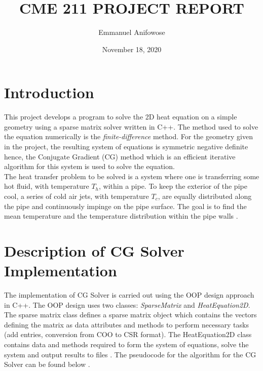 \documentclass{article}
\title{CME 211 PROJECT REPORT}
\author{Emmanuel Anifowose}
\date{November 18, 2020}
\begin{document}
\setlength{\parindent}{0pt}
\setlength{\parskip}{1ex}

\maketitle

\section{Introduction}
This project develops a program to solve the 2D heat equation on a simple geometry
using a sparse matrix solver written in C++. The method used to solve the equation
numerically is the \emph{finite-difference} method. For the geometry given in the project,
the resulting system of equations is symmetric negative definite hence, the Conjugate
Gradient (CG) method which is an efficient iterative algorithm for this system is
used to solve the equation\cite{CME211:2020:ProjectPart1}.\\
The heat transfer problem to be solved is a system where one is transferring some hot
fluid, with temperature $T_h$, within a pipe. To keep the exterior of the pipe cool,
a series of cold air jets, with temperature $T_c$, are equally distributed along the
pipe and continuously impinge on the pipe surface. The goal is to find the mean
temperature and the temperature distribution within the pipe walls
\cite{CME211:2020:ProjectPart2}.

\section{Description of CG Solver Implementation}
The implementation of CG Solver is carried out using the OOP design approach in C++.
The OOP design uses two classes: \emph{SparseMatrix} and \emph{HeatEquation2D}.\\ The
sparse matrix class defines a sparse matrix object which contains the vectors defining
the matrix as data attributes and methods to perform necessary tasks (add entries,
conversion from COO to CSR format). The HeatEquation2D class contains data and methods
required to form the system of equations, solve the system and output results to files
\cite{CME211:2020:ProjectPart2}.
The pseudocode for the algorithm for the CG Solver can be found below
\cite{CME211:2020:ProjectPart1}.\\
\end{document}
